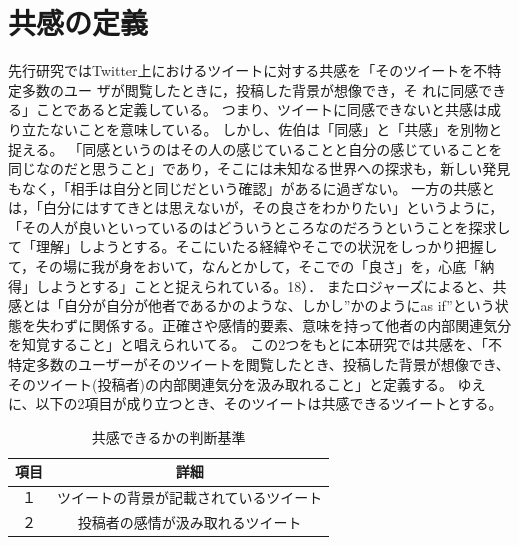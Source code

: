 \documentclass[dvipdfmx]{issj}
\begin{document}
\section{共感の定義}  %

先行研究ではTwitter上におけるツイートに対する共感を「そのツイートを不特定多数のユー ザが閲覧したときに，投稿した背景が想像でき，そ れに同感できる」ことであると定義している。
つまり、ツイートに同感できないと共感は成り立たないことを意味している。
しかし、佐伯は「同感」と「共感」を別物と捉える。
「同感というのはその人の感じていることと自分の感じていることを同じなのだと思うこと」であり，そこには未知なる世界への探求も，新しい発見もなく，「相手は自分と同じだという確認」があるに過ぎない。
一方の共感とは，「白分にはすてきとは思えないが，その良さをわかりたい」というように，「その人が良いといっているのはどういうところなのだろうということを探求して「理解」しようとする。そこにいたる経緯やそこでの状況をしっかり把握して，その場に我が身をおいて，なんとかして，そこでの「良さ」を，心底「納得」しようとする」ことと捉えられている。18）．
またロジャーズによると、共感とは「自分が自分が他者であるかのような、しかし”かのようにas if”という状態を失わずに関係する。正確さや感情的要素、意味を持って他者の内部関連気分を知覚すること」と唱えられいてる。
この2つをもとに本研究では共感を、「不特定多数のユーザーがそのツイートを閲覧したとき、投稿した背景が想像でき、そのツイート(投稿者)の内部関連気分を汲み取れること」と定義する。
ゆえに、以下の2項目が成り立つとき、そのツイートは共感できるツイートとする。

\begin{table}[htbp]\centering
\caption{共感できるかの判断基準}\label{tbl:font}
\begin{small}
\begin{tabular}{|c|c|} \hline
項目   & 詳細\\\hline\hline
１& ツイートの背景が記載されているツイート\\\hline
２ & 投稿者の感情が汲み取れるツイート\\\hline
\end{tabular}
\end{small}
\end{table}


\end{document}
